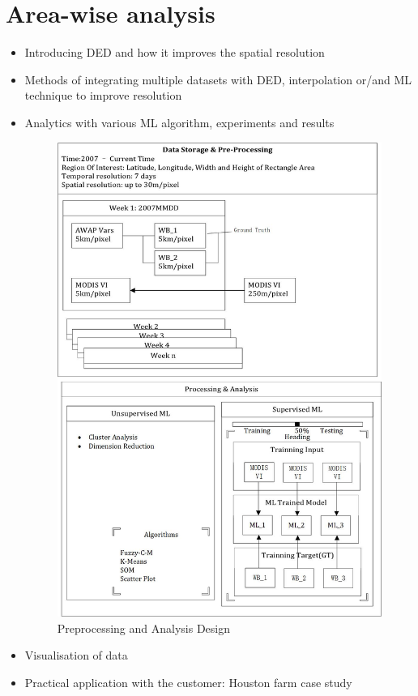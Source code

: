 \documentclass[12pt,journal,compsoc,onecolumn]{IEEEtran}
\begin{document}
\section{Area-wise analysis}
\begin{itemize}
\item
Introducing DED and how it improves the spatial resolution
\item
Methods of integrating multiple datasets with DED, interpolation or/and ML technique to improve resolution
\item
Analytics with various ML algorithm, experiments and results
	\begin{figure}[H]
	\includegraphics[width=15cm]{Drawing1.jpg}
	\caption{Preprocessing and Analysis Design}\label{fig:Drawing1.jpg}
	\end{figure}
\item
Visualisation of data
\item
Practical application with the customer: Houston farm case study
\end{itemize}
\end{document}
